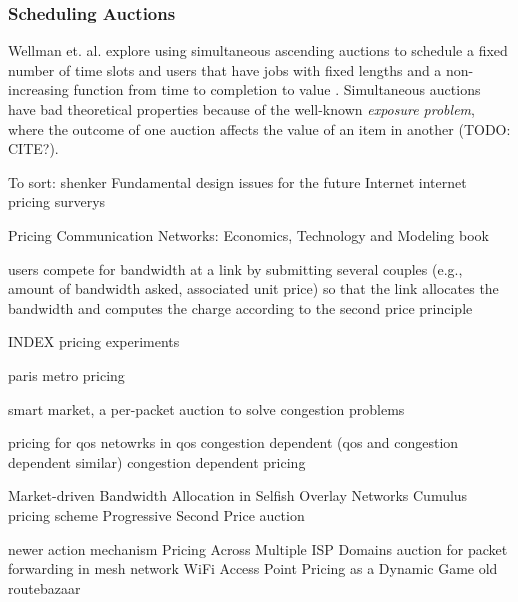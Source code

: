 \subsubsection{Scheduling Auctions}
Wellman et. al. explore using simultaneous ascending auctions to schedule a fixed number of time slots and users that have jobs with fixed lengths and a non-increasing function from time to completion to value \cite{wellman01, wellman05}.
Simultaneous auctions have bad theoretical properties because of the well-known \emph{exposure problem}, where the outcome of one auction affects the value of an item in another (TODO: CITE?).


To sort:
shenker Fundamental design issues for the future Internet \cite{shenker95}
internet pricing surverys\cite{stiller01, falkner00, odlyzko01}

Pricing Communication Networks: Economics, Technology and Modeling book \cite{courcoubetis03}

users compete for bandwidth at a link by submitting several couples (e.g., amount of bandwidth asked, associated unit price) so that the link allocates the bandwidth and computes the charge according to the second price principle \cite{maille06}


INDEX pricing experiments \cite{altmann99, edell99}

paris metro pricing \cite{odlyzko99}

smart market, a per-packet auction to solve congestion problems

pricing for qos netowrks \cite{dasilva00, marbach04}
in qos congestion dependent (qos and congestion dependent similar) \cite{shu03}
congestion dependent pricing \cite{peha97, paschalidis00, la00, la02}

Market-driven Bandwidth Allocation in Selfish Overlay Networks \cite{wang05}
Cumulus pricing scheme \cite{reichl01, stiller01cumulus, reichl01edgepricing, reichl03, hayel05}
Progressive Second Price auction  \cite{lazar98, lazar99, semret99, semret00,maille03, bitsaki05, beltran07}

newer action mechanism \cite{dramitinos07}
Pricing Across Multiple ISP Domains \cite{saberi07}
auction for packet forwarding in mesh network \cite{chen04}
WiFi Access Point Pricing as a Dynamic Game \cite{musacchio06}
old routebazaar \cite{esquivel09}
